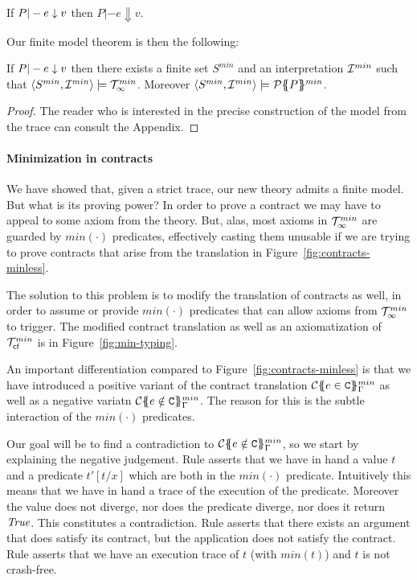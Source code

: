 \begin{lemma}
If $P |- e \downarrow v$ then $P |- e \Downarrow v$.
\end{lemma} 

Our finite model theorem is then the following:

\begin{theorem}\label{thm:finite-model} If $P |- e \downarrow v$ then there exists 
a finite set $S^{min}$ and an interpretation ${\cal I}^{min}$ such that 
$\langle S^{min},{\cal I}^{min}\rangle \models {\cal T}_{\infty}^{min}$. Moreover 
$\langle S^{min},{\cal I}^{min}\rangle \models {\cal P}\{\!\!\{P\}\!\!\}^{min}$. 
\end{theorem}
\begin{proof} The reader who is interested in the precise 
construction of the model from the trace can consult the 
Appendix. 
\end{proof}

\paragraph{Minimization in contracts}
\newcommand{\ctransmin}[3]{\ctrans{#1}{#2}{#3}^{min}} 
\newcommand{\calI}{{\cal J}}

We have showed that, given a strict trace, our new theory admits a finite model. But what is its proving 
power? In order to prove a contract we may have to appeal to some axiom from the theory. But, alas, most
axioms in ${\cal T}_{\infty}^{min}$ are guarded by $min(\cdot)$ predicates, effectively casting them unusable if we are 
trying to prove contracts that arise from the translation in Figure~\ref{fig:contracts-minless}.

The solution to this problem is to modify the translation of contracts as well, in order to assume 
or provide $min(\cdot)$ predicates that can allow axioms from ${\cal T}_{\infty}^{min}$ to trigger. The modified 
contract translation as well as an axiomatization of ${\cal T}_{\textsf{cf}}^{min}$ is in Figure~\ref{fig:min-typing}.

An important differentiation compared to Figure~\ref{fig:contracts-minless} is that we have introduced
a positive variant of the contract translation $\ctransmin{}{\Gamma}{e \in \Ct}$ as well as a 
negative variatn $\ctransmin{}{\Gamma}{e \notin \Ct}$. The reason for this is the subtle interaction of
the $min(\cdot)$ predicates. 

Our goal will be to find a contradiction to $\ctransmin{}{\Gamma}{e \notin \Ct}$, so we start by explaining
the negative judgement. Rule  asserts that we have in hand a value $t$ and a predicate 
$t'[t/x]$ which are both in the $min(\cdot)$ predicate. Intuitively this means that we have in hand a trace 
of the execution of the predicate. Moreover the value does not diverge, nor does the predicate diverge, nor
does it return $\textit{True}$. This constitutes a contradiction. Rule  asserts that there exists an
argument that does satisfy its contract, but the application does not satisfy the contract. Rule 
asserts that we have an execution trace of $t$ (with $min(t)$) and $t$ is not crash-free.

